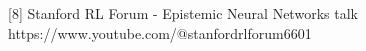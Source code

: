 \documentclass[preview]{standalone}
\begin{document}
\begin{center}
[8] Stanford RL Forum - Epistemic Neural Networks talk\\https://www.youtube.com/@stanfordrlforum6601
\end{center}
\end{document}

